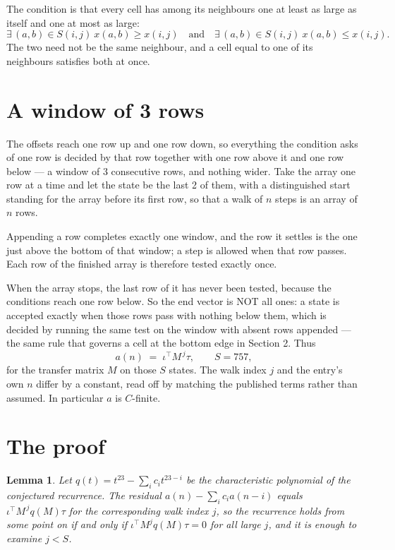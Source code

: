 \documentclass[11pt,a4paper]{article}
\theoremstyle{plain}
\newtheorem{lemma}[theorem]{Lemma}
\theoremstyle{definition}
\begin{document}
The condition is that every cell has among its neighbours one at least as large as itself and one at most as large:
\[
\exists\,(a,b)\in S(i,j)\ x(a,b)\ge x(i,j)\quad\text{and}\quad\exists\,(a,b)\in S(i,j)\ x(a,b)\le x(i,j).
\]
The two need not be the same neighbour, and a cell equal to one of its neighbours satisfies both at once.

\section{A window of 3 rows}

The offsets reach one row up and one row down, so everything the condition asks of one row is
decided by that row together with one row above it and one row below --- a window of
$3$ consecutive rows, and nothing wider. Take the array one row at a time and
let the state be the last 2 of them, with a distinguished start standing for the array before its
first row, so that a walk of $n$ steps is an array of $n$ rows.

Appending a row completes exactly one window, and the row it settles is the one just above the bottom of that window; a step is
allowed when that row passes. Each row of the finished array is therefore tested exactly once.

When the array stops, the last row of it has never been tested, because the
conditions reach one row below. So the end vector is NOT all ones: a state is accepted exactly when
those rows pass with nothing below them, which is decided by running the same test on the window
with absent rows appended --- the same rule that governs a cell at the bottom edge in
Section 2.
Thus
\[
a(n)\;=\;\iota^{\!\top}M^{\,j}\tau ,\qquad S=757,
\]
for the transfer matrix $M$ on those $S$ states. The walk index $j$ and the entry's own $n$
differ by a constant, read off by matching the published terms rather than assumed. In
particular $a$ is $C$-finite.

\section{The proof}

\begin{lemma}\label{lem:crit}
Let $q(t)=t^{23}-\sum_i c_it^{23-i}$ be the characteristic polynomial of the
conjectured recurrence. The residual $a(n)-\sum_ic_ia(n-i)$ equals
$\iota^{\!\top}M^{\,j}q(M)\tau$ for the corresponding walk index $j$, so the recurrence
holds from some point on if and only if $\iota^{\!\top}M^{j}q(M)\tau=0$ for all large $j$,
and it is enough to examine $j<S$.
\end{lemma}
\end{document}
